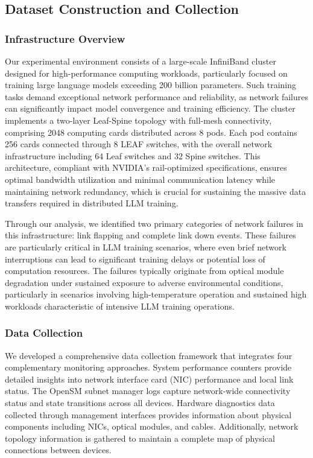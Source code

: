 \documentclass[conference]{IEEEtran}
\begin{document}
\begin{table}[!t]
\begin{tabular}{l|ccc|ccc}
\hline\hline
\end{tabular}
\end{table}

\subsection{Dataset Construction and Collection}

\subsubsection{Infrastructure Overview}
Our experimental environment consists of a large-scale InfiniBand cluster designed for high-performance computing workloads, particularly focused on training large language models exceeding 200 billion parameters. Such training tasks demand exceptional network performance and reliability, as network failures can significantly impact model convergence and training efficiency. The cluster implements a two-layer Leaf-Spine topology with full-mesh connectivity, comprising 2048 computing cards distributed across 8 pods. Each pod contains 256 cards connected through 8 LEAF switches, with the overall network infrastructure including 64 Leaf switches and 32 Spine switches. This architecture, compliant with NVIDIA's rail-optimized specifications, ensures optimal bandwidth utilization and minimal communication latency while maintaining network redundancy, which is crucial for sustaining the massive data transfers required in distributed LLM training.

Through our analysis, we identified two primary categories of network failures in this infrastructure: link flapping and complete link down events. These failures are particularly critical in LLM training scenarios, where even brief network interruptions can lead to significant training delays or potential loss of computation resources. The failures typically originate from optical module degradation under sustained exposure to adverse environmental conditions, particularly in scenarios involving high-temperature operation and sustained high workloads characteristic of intensive LLM training operations. 

\subsubsection{Data Collection}
We developed a comprehensive data collection framework that integrates four complementary monitoring approaches. System performance counters provide detailed insights into network interface card (NIC) performance and local link status. The OpenSM subnet manager logs capture network-wide connectivity status and state transitions across all devices. Hardware diagnostics data collected through management interfaces provides information about physical components including NICs, optical modules, and cables. Additionally, network topology information is gathered to maintain a complete map of physical connections between devices. 
\end{document}
